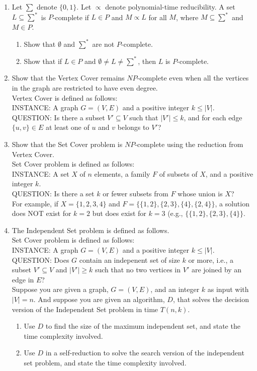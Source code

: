 \documentclass{article}%
\begin{document}
\begin{enumerate}

	\item Let $\sum$ denote $\{0,1\}$. Let $\propto $ denote polynomial-time reducibility. A set $L \subseteq \sum^*$ is $P$-complete if $L \in P$ and $M \propto L$ for all $M$, where $M \subseteq \sum^*$ and $M \in P$.
	\begin {enumerate}
	\item Show that $\emptyset$ and $\sum^*$ are not $P$-complete.
	\item Show that if $L \in P$ and $\emptyset \neq L \neq \sum^*$, then $L$ is  $P$-complete.  
	\end{enumerate}


  \item Show that the Vertex Cover remains $NP$-complete even when all the vertices in the graph 	are restricted to have even degree.\\
  Vertex Cover is defined as follows:\\
  INSTANCE: A graph $G=(V,E)$ and a positive integer $k \leq |V|$.\\
  QUESTION: Is there a subset $V' \subseteq V$ such that $|V'| \leq k$, and for each edge $\{u,v\} \in E$ at least one of $u$ and $v$ belongs to $V'$?
  
	\item Show that the Set Cover problem is $NP$-complete using the reduction from Vertex Cover.\\
  Set Cover problem is defined as follows:\\
  INSTANCE: A set $X$ of $n$ elements, a family $F$ of subsets of $X$, and a positive integer $k$.\\
  QUESTION: Is there a set $k$ or fewer subsets from $F$  whose union is $X$?\\
  For example, if $X=\{1,2,3,4\}$ and $F=\{\{1,2\}, \{2,3\}, \{4\}, \{2,4\}\}$, a solution does NOT exist for $k=2$ but does exist for $k=3$ (e.g., $\{\{1,2\}, \{2,3\}, \{4\}\}$.
  
  	\item The Independent Set problem is defined as follows.\\
  Set Cover problem is defined as follows:\\
  INSTANCE: A graph $G=(V,E)$ and a positive integer $k \leq |V|$.\\
  QUESTION: Does $G$ contain an indepenent set of size $k$ or more, i.e., a subset $V' \subseteq V$ and  $|V'| \geq k$ such that no two vertices in $V'$ are joined by an edge in $E$?\\
  Suppose you are given a graph, $G=(V,E)$, and an integer $k$ as input with $|V|=n$. And suppose you are given an algorithm, $D$, that solves the decision version of the Independent Set problem in time $T(n,k)$.
  	\begin {enumerate}
	\item Use $D$ to find the size of the maximum independent set, and state the time complexity involved.
	\item Use $D$ in a self-reduction to solve the search version of the independent set problem, and state the time complexity involved.  
	\end{enumerate}
	\end{enumerate}
\end{document}
